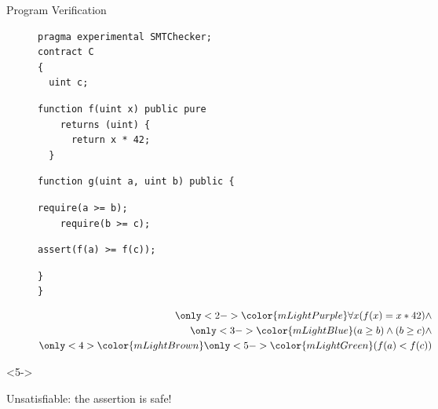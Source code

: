 \documentclass[aspectratio=169,10pt]{beamer}
\begin{document}
\begin{frame}[fragile]{Program Verification}
\begin{figure}
\noindent\begin{minipage}{.4\textwidth}
\begin{lstlisting}[basicstyle=\scriptsize]
pragma experimental SMTChecker;
contract C
{
  uint c;
\end{lstlisting}
{
\vspace*{-0.5cm}
\begin{lstlisting}[basicstyle=\scriptsize]
  function f(uint x) public pure
    returns (uint) {
      return x * 42;
  }
\end{lstlisting}
}
\vspace*{-0.5cm}
\begin{lstlisting}[basicstyle=\scriptsize]
  function g(uint a, uint b) public {
\end{lstlisting}
{
\vspace*{-0.5cm}
\begin{lstlisting}[basicstyle=\scriptsize]
    require(a >= b);
    require(b >= c);
\end{lstlisting}
}
{
\vspace*{-0.5cm}
\begin{lstlisting}[basicstyle=\scriptsize]
    assert(f(a) >= f(c));
\end{lstlisting}
}
\vspace*{-0.5cm}
\begin{lstlisting}[basicstyle=\scriptsize]
  }
}
\end{lstlisting}
\end{minipage}
\begin{minipage}{.4\textwidth}
\begin{equation*}
\begin{split}
	{\only<2->{\color{mLightPurple}}\forall x (f(x) = x * 42)} \land \\
	{\only<3->{\color{mLightBlue}}(a \ge b) \land (b \ge c)} \land \\
	{\only<4>{\color{mLightBrown}}\only<5->{\color{mLightGreen}}(f(a) < f(c))}
\end{split}
\end{equation*}
\end{minipage}
\end{figure}

\begin{onlyenv}<5->
\begin{center}
Unsatisfiable: the assertion is safe!
\end{center}
\end{onlyenv}

\end{frame}
\end{document}
